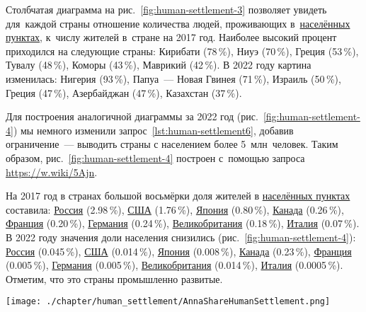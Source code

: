 Столбчатая диаграмма на рис.~\ref{fig:human-settlement-3} позволяет увидеть для~каждой страны 
отношение количества людей, 
проживающих в~\href{http://www.wikidata.org/entity/Q486972}{населённых пунктах}, 
к~числу жителей в~стране на 2017 год.
Наиболее высокий процент приходился на следующие страны: 
Кирибати (78\,\%), Ниуэ (70\,\%), Греция (53\,\%), Тувалу (48\,\%), Коморы (43\,\%), Маврикий (42\,\%). 
В 2022 году картина изменилась: Нигерия (93\,\%), Папуа~--- Новая Гвинея (71\,\%), 
Израиль (50\,\%), Греция (47\,\%), Азербайджан (47\,\%), Казахстан (37\,\%). 


Для построения аналогичной диаграммы за 2022 год (рис.~\ref{fig:human-settlement-4}) 
мы немного изменили запрос~\ref{lst:human-settlement6}, 
добавив ограничение~--- выводить страны с населением более 5~млн~человек. Таким образом, рис.~\ref{fig:human-settlement-4} построен 
с~помощью запроса \href{https://w.wiki/5Ajn}{https://w.wiki/5Ajn}. 


На 2017 год в странах большой восьмёрки доля жителей 
в \href{http://www.wikidata.org/entity/Q486972}{населённых пунктах} составила: 
\href{http://www.wikidata.org/entity/Q159}{Россия} (\num{2.98}\,\%), 
\href{http://www.wikidata.org/entity/Q30}{США} (\num{1.76}\,\%), 
\href{http://www.wikidata.org/entity/Q17}{Япония} (\num{0.80}\,\%), 
\href{http://www.wikidata.org/entity/Q16}{Канада} (\num{0.26}\,\%), 
\href{http://www.wikidata.org/entity/Q142}{Франция} (\num{0.20}\,\%), 
\href{http://www.wikidata.org/entity/Q183}{Германия} (\num{0.24}\,\%), 
\href{http://www.wikidata.org/entity/Q145}{Великобритания} (\num{0.18}\,\%), 
\href{http://www.wikidata.org/entity/Q38}{Италия} (\num{0.07}\,\%). 
В 2022 году значения доли населения снизились (рис.~\ref{fig:human-settlement-4}): 
\href{http://www.wikidata.org/entity/Q159}{Россия} (0.045\,\%), 
\href{http://www.wikidata.org/entity/Q30}{США} (\num{0.014}\,\%), 
\href{http://www.wikidata.org/entity/Q17}{Япония} (\num{0.008}\,\%), 
\href{http://www.wikidata.org/entity/Q16}{Канада} (\num{0.23}\,\%), 
\href{http://www.wikidata.org/entity/Q142}{Франция} (\num{0.005}\,\%), 
\href{http://www.wikidata.org/entity/Q183}{Германия} (\num{0.005}\,\%), 
\href{http://www.wikidata.org/entity/Q145}{Великобритания} (\num{0.014}\,\%), 
\href{http://www.wikidata.org/entity/Q38}{Италия} (\num{0.0005}\,\%). 
Отметим, что это страны промышленно развитые.

\begin{figure*}
    \texttt{[image: ./chapter/human\_settlement/AnnaShareHumanSettlement.png]}
	\label{fig:human-settlement-3}
	\caption[Доля населения страны, проживающего в населённых пунктах, 2017 год.]{Доля населения страны, проживающего в~<<населённых пунктах>>, 2017 год. Ссылка на SPARQL-запрос: \href{https://w.wiki/4dE3}{https://w.wiki/4dE3}}%
\end{figure*} 


